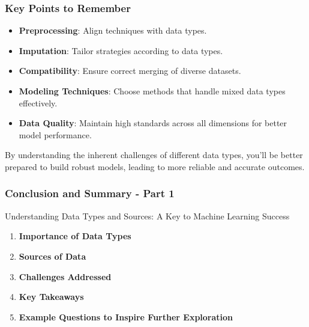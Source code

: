 \documentclass[aspectratio=169]{beamer}
\begin{document}
\begin{frame}[fragile]
    \frametitle{Key Points to Remember}
    \begin{itemize}
        \item \textbf{Preprocessing}: Align techniques with data types.
        \item \textbf{Imputation}: Tailor strategies according to data types.
        \item \textbf{Compatibility}: Ensure correct merging of diverse datasets.
        \item \textbf{Modeling Techniques}: Choose methods that handle mixed data types effectively.
        \item \textbf{Data Quality}: Maintain high standards across all dimensions for better model performance.
    \end{itemize}
    
    By understanding the inherent challenges of different data types, you'll be better prepared to build robust models, leading to more reliable and accurate outcomes.
\end{frame}

\begin{frame}[fragile]
    \frametitle{Conclusion and Summary - Part 1}
    \begin{block}{Understanding Data Types and Sources: A Key to Machine Learning Success}
        \begin{enumerate}
            \item \textbf{Importance of Data Types}
            \item \textbf{Sources of Data}
            \item \textbf{Challenges Addressed}
            \item \textbf{Key Takeaways}
            \item \textbf{Example Questions to Inspire Further Exploration}
        \end{enumerate}
    \end{block}
\end{frame}
\end{document}
